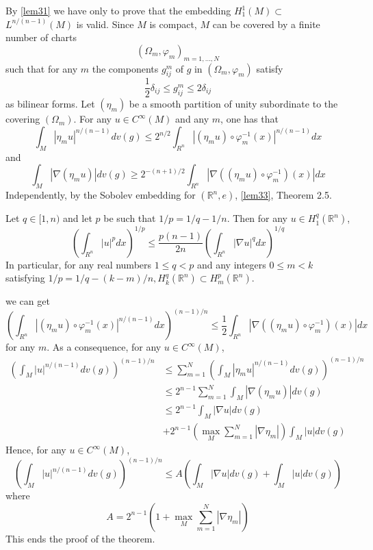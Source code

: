 \documentclass[12pt,hyperref,a4paper,UTF8]{ctexart}
\begin{document}
\begin{Proof}
    By \autoref{lem31} we have only to prove that the embedding $H_1^1(M) \subset$ $L^{n /(n-1)}(M)$ is valid. Since $M$ is compact, $M$ can be covered by a finite number of charts
$$
\left(\Omega_m, \varphi_m\right)_{m=1, \ldots, N}
$$
such that for any $m$ the components $g_{i j}^m$ of $g$ in $\left(\Omega_m, \varphi_m\right)$ satisfy
$$
\frac{1}{2} \delta_{i j} \leq g_{i j}^m \leq 2 \delta_{i j}
$$
as bilinear forms. Let $\left(\eta_m\right)$ be a smooth partition of unity subordinate to the covering $\left(\Omega_m\right)$. For any $u \in C^{\infty}(M)$ and any $m$, one has that
$$
\int_M\left|\eta_m u\right|^{n /(n-1)} d v(g) \leq 2^{n / 2} \int_{R^n}\left|\left(\eta_m u\right) \circ \varphi_m^{-1}(x)\right|^{n /(n-1)} d x
$$
and
$$
\int_M\left|\nabla\left(\eta_m u\right)\right| d v(g) \geq 2^{-(n+1) / 2} \int_{R^n}\left|\nabla\left(\left(\eta_m u\right) \circ \varphi_m^{-1}\right)(x)\right| d x
$$
Independently, by the Sobolev embedding for $({\mathbb{R}^n},e)$, \autoref{lem33}, \cite{H1} Theorem 2.5.
\begin{Lemma}
Let $q \in[1, n)$ and let $p$ be such that $1 / p=1 / q-1 / n$. Then for any $u \in H_1^q\left(\mathbb{R}^n\right)$,
$$
\left(\int_{R^n}|u|^p d x\right)^{1 / p} \leq \frac{p(n-1)}{2 n}\left(\int_{R^n}|\nabla u|^q d x\right)^{1 / q}
$$
In particular, for any real numbers $1 \leq q<p$ and any integers $0 \leq m<k$ satisfying $1 / p=1 / q-(k-m) / n, H_k^q\left(\mathbb{R}^n\right) \subset H_m^p\left(\mathbb{R}^n\right)$.
\label{lem33}
\end{Lemma}

\noindent
we can get
$$
\left(\int_{R^n}\left|\left(\eta_m u\right) \circ \varphi_m^{-1}(x)\right|^{n /(n-1)} d x\right)^{(n-1) / n} \leq \frac{1}{2} \int_{R^n}\left|\nabla\left(\left(\eta_m u\right) \circ \varphi_m^{-1}\right)(x)\right| d x
$$
for any $m$. As a consequence, for any $u \in C^{\infty}(M)$,
$$
\begin{aligned}
\left(\int_M|u|^{n /(n-1)} d v(g)\right)^{(n-1) / n} & \leq \sum_{m=1}^N\left(\int_M\left|\eta_m u\right|^{n /(n-1)} d v(g)\right)^{(n-1) / n} \\
&\leq  2^{n-1} \sum_{m=1}^N \int_M\left|\nabla\left(\eta_m u\right)\right| d v(g) \\
&\leq  2^{n-1} \int_M|\nabla u| d v(g) \\
& +2^{n-1}\left(\max _M \sum_{m=1}^N\left|\nabla \eta_m\right|\right) \int_M|u| d v(g)
\end{aligned}
$$
Hence, for any $u \in C^{\infty}(M)$,
$$
\left(\int_M|u|^{n /(n-1)} d v(g)\right)^{(n-1) / n} \leq A\left(\int_M|\nabla u| d v(g)+\int_M|u| d v(g)\right)
$$
where
$$
A=2^{n-1}\left(1+\max _M \sum_{m=1}^N\left|\nabla \eta_m\right|\right)
$$
This ends the proof of the theorem.
\end{Proof}
\end{document}
